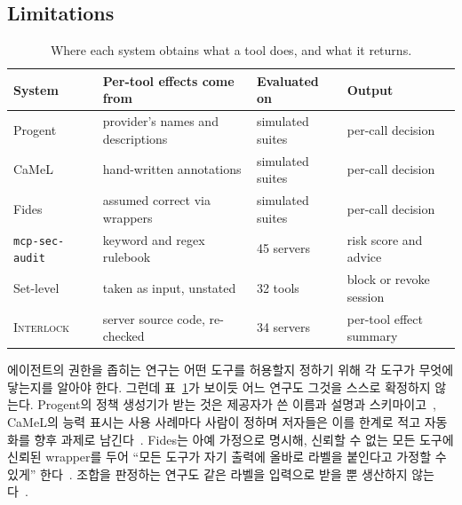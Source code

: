 \documentclass[acmsmall,screen,review,anonymous]{acmart}
\begin{document}
\subsection{Limitations}
\label{sec:prelim:limitation}

\begin{table}[h]
\caption{Where each system obtains what a tool does, and what it returns.}
\label{tab:baselines}
\small
\begin{tabular}{llll}
\toprule
System & Per-tool effects come from & Evaluated on & Output \\
\midrule
Progent~\cite{shi2025progent} & provider's names and descriptions & simulated suites & per-call decision \\
CaMeL~\cite{debenedetti2025defeating} & hand-written annotations & simulated suites & per-call decision \\
Fides~\cite{costa2025securing} & assumed correct via wrappers & simulated suites & per-call decision \\
\texttt{mcp-sec-audit}~\cite{huang2026auditing} & keyword and regex rulebook & 45 servers & risk score and advice \\
Set-level~\cite{beurerkellner2025toxicflow, schneider2026securing} & taken as input, unstated & 32 tools & block or revoke session \\
\midrule
\textsc{Interlock} & server source code, re-checked & 34 servers & per-tool effect summary \\
\bottomrule
\end{tabular}
\end{table}

에이전트의 권한을 좁히는 연구는 어떤 도구를 허용할지 정하기 위해 각 도구가 무엇에 닿는지를 알아야 한다. 그런데 표~\ref{tab:baselines}가 보이듯 어느 연구도 그것을 스스로 확정하지 않는다. Progent의 정책 생성기가 받는 것은 제공자가 쓴 이름과 설명과 스키마이고~\cite{shi2025progent}, CaMeL의 능력 표시는 사용 사례마다 사람이 정하며 저자들은 이를 한계로 적고 자동화를 향후 과제로 남긴다~\cite{debenedetti2025defeating}. Fides는 아예 가정으로 명시해, 신뢰할 수 없는 모든 도구에 신뢰된 wrapper를 두어 ``모든 도구가 자기 출력에 올바로 라벨을 붙인다고 가정할 수 있게'' 한다~\cite{costa2025securing}. 조합을 판정하는 연구도 같은 라벨을 입력으로 받을 뿐 생산하지 않는다~\cite{beurerkellner2025toxicflow, schneider2026securing}.
\end{document}

